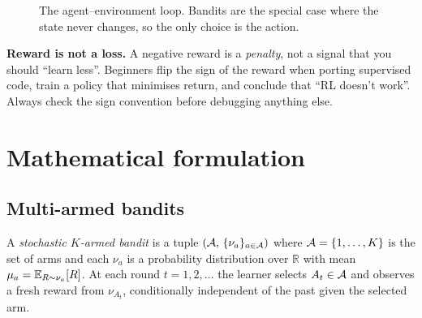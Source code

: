 \documentclass[11pt,oneside]{scrbook}
\begin{document}
\begin{figure}[h]\centering
{}
\caption{The agent--environment loop. Bandits are the special case where the
state never changes, so the only choice is the action.}
\label{fig:loop}
\end{figure}

\begin{pitfall}
\textbf{Reward is not a loss.} A negative reward is a \emph{penalty}, not a
signal that you should ``learn less''. Beginners flip the sign of the reward
when porting supervised code, train a policy that minimises return, and
conclude that ``RL doesn't work''. Always check the sign convention before
debugging anything else.
\end{pitfall}

\chapter{Mathematical formulation}
\label{ch:math}

\section{Multi-armed bandits}

\begin{definition}
A \emph{stochastic $K$-armed bandit} is a tuple $(\mathcal{A},\, \{\nu_a\}_{a\in\mathcal{A}})$
where $\mathcal{A}=\{1,\dots,K\}$ is the set of arms and each $\nu_a$ is a
probability distribution over $\mathbb{R}$ with mean
$\mu_a = \mathbb{E}_{R\sim\nu_a}[R]$. At each round $t = 1,2,\dots$ the learner
selects $A_t\in\mathcal{A}$ and observes a fresh reward from $\nu_{A_t}$,
conditionally independent of the past given the selected arm.
\end{definition}
\end{document}

